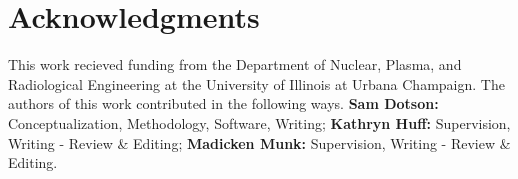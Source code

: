 \section{Acknowledgments}
This work recieved funding from the Department of Nuclear, Plasma, and Radiological Engineering at the University of Illinois at Urbana Champaign. 
The authors of this work contributed in the following ways.
\textbf{Sam Dotson:} Conceptualization, Methodology, Software, Writing;
\textbf{Kathryn Huff:} Supervision, Writing - Review \& Editing;
\textbf{Madicken Munk:} Supervision, Writing - Review \& Editing.

